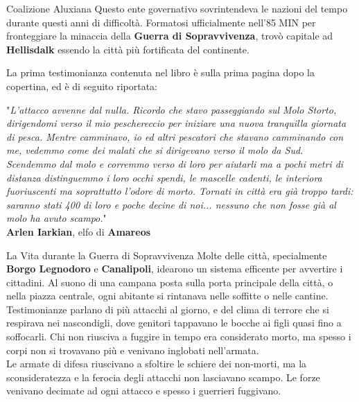 \documentclass[10pt,twoside,onecolumn,openany]{book}
\begin{document}
\begin{paperbox}{{Coalizione Aluxiana}}
	Questo ente governativo sovrintendeva le nazioni del tempo durante questi anni di difficoltà. Formatosi ufficialmente nell'85 MIN per fronteggiare la minaccia della \textbf{Guerra di Sopravvivenza}, trovò capitale ad \textbf{Hellisdalk} essendo la città più fortificata del continente.
\end{paperbox}
\begin{multicols}{2}
La prima testimonianza contenuta nel libro è sulla prima pagina dopo la copertina, ed è di seguito riportata:\\
\begin{quotebox}
	"\textit{L'attacco avvenne dal nulla. Ricordo che stavo passeggiando sul Molo Storto, dirigendomi verso il mio peschereccio per iniziare una nuova tranquilla giornata di pesca. Mentre camminavo, io ed altri pescatori che stavano camminando con me, vedemmo come dei malati che si dirigevano verso il molo da Sud. Scendemmo dal molo e corremmo verso di loro per aiutarli ma a pochi metri di distanza distinguemmo i loro occhi spendi, le mascelle cadenti, le interiora fuoriuscenti ma soprattutto l'odore di morto. Tornati in città era già troppo tardi: saranno stati 400 di loro e poche decine di noi... nessuno che non fosse già al molo ha avuto scampo.}"\\ \textbf{Arlen Iarkian}, elfo di \textbf{Amareos}
\end{quotebox}
\columnbreak
\begin{paperbox}{{La Vita durante la Guerra di Sopravvivenza}}
	Molte delle città, specialmente \textbf{Borgo Legnodoro} e \textbf{Canalipoli}, idearono un sistema efficente per avvertire i cittadini. Al suono di una campana posta sulla porta principale della città, o nella piazza centrale, ogni abitante si rintanava nelle soffitte o nelle cantine. Testimonianze parlano di più attacchi al giorno, e del clima di terrore che si respirava nei nascondigli, dove genitori tappavano le bocche ai figli quasi fino a soffocarli. Chi non riusciva a fuggire in tempo era considerato morto, ma spesso i corpi non si trovavano più e venivano inglobati nell'armata.\\
	Le armate di difesa riuscivano a sfoltire le schiere dei non-morti, ma la sconsideratezza e la ferocia degli attacchi non lasciavano scampo. Le forze venivano decimate ad ogni attacco e spesso i guerrieri fuggivano.\\
\end{paperbox}
\end{multicols}
\newpage
\end{document}
